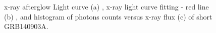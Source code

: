 \begin{figure}[hpbt]
\caption{x-ray  afterglow Light curve (a) , x-ray  light curve fitting - red line (b) , and histogram  of  photons counts  versus x-ray flux  (c)  of short GRB140903A.}
\end{figure}  
